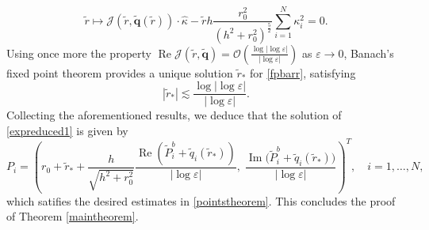 \documentclass[11pt,reqno,a4paper]{amsart}
\numberwithin{equation}{section}
\newcommand{\ve}{\varepsilon}
\begin{document}
\begin{equation}\label{fpbarr}
    \tilde{r}\mapsto \mathcal{J}\left(\tilde{r},\tilde{\mathbf{q}}(\tilde{r})\right)\cdot\hat\kappa-\tilde{r}h\frac{r_0^2}{(h^2+r_0^2)^{\frac 5 2}}\sum\limits_{i=1}^{N}\kappa_i^{2}=0.
\end{equation}
 Using once more the property
 $\operatorname{Re}\mathcal{J}(\tilde{r},\tilde{\mathbf{q}})=\mathcal{O}\left(\frac{\log|\log\ve|}{|\log\ve|}\right) $ as $\ve \to 0$, Banach's fixed point theorem provides a unique solution $\tilde{r}_{*}$ for \eqref{fpbarr}, satisfying \[|\tilde{r}_{*}|\lesssim \frac{\log|\log\ve|}{|\log\ve|}.\]
Collecting the aforementioned results, we deduce that the  solution of \eqref{expreduced1} is given by
\[
P_i=\left(
r_0+\tilde{r}_{*}+\frac{h}{\sqrt{h^{2}+r_0^2}}\frac{\operatorname{Re}\left(\widetilde{P}_i^{b}+\tilde{q}_i(\tilde{r}_{*})\right)}{|\log\ve|},
\;
\frac{\operatorname{Im}\big(\widetilde{P}_i^{b}+\tilde{q}_i(\tilde{r}_{*})\big)}{|\log\ve|}
\right)^{T},\quad i=1,\dots,N,
\]
which satifies the desired estimates in \eqref{pointstheorem}. This concludes the proof of Theorem \ref{maintheorem}.
\end{document}
